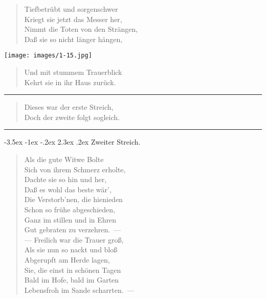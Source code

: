 \documentclass[a4paper,12pt]{article}
\makeatletter
\renewcommand\section{\@startsection {section}{1}{\z@}%
                                   {-3.5ex \@plus -1ex \@minus -.2ex}%
                                   {2.3ex \@plus.2ex}%
                                   {\centering\normalfont\LARGE\bfseries}}
\makeatother
\begin{document}
\begin{verse}
Tiefbetrübt und sorgenschwer\\{}
Kriegt sie jetzt das Messer her,\\{}
Nimmt die Toten von den Strängen,\\{}
Daß sie so nicht länger hängen,
\end{verse}



\begin{center}\texttt{[image: images/1-15.jpg]}\end{center}



\begin{verse}
Und mit stummem Trauerblick\\{}
Kehrt sie in ihr Haus zurück.
\end{verse}


\hrule


\begin{verse}
Dieses war der erste Streich,\\{}
Doch der zweite folgt sogleich.
\end{verse}


\hrule


\clearpage
\section{Zweiter Streich.\label{Zweiter_Streich}}


\begin{verse}
Als die gute Witwe Bolte\\{}
Sich von ihrem Schmerz erholte,\\{}
Dachte sie so hin und her,\\{}
Daß es wohl das beste wär',\\{}
Die Verstorb'nen, die hienieden\\{}
Schon so frühe abgeschieden,\\{}
Ganz im stillen und in Ehren\\{}
Gut gebraten zu verzehren.~—\\{}
— Freilich war die Trauer groß,\\{}
Als sie nun so nackt und bloß\\{}
Abgerupft am Herde lagen,\\{}
Sie, die einst in schönen Tagen\\{}
Bald im Hofe, bald im Garten\\{}
Lebensfroh im Sande scharrten.~—
\end{verse}
\end{document}
